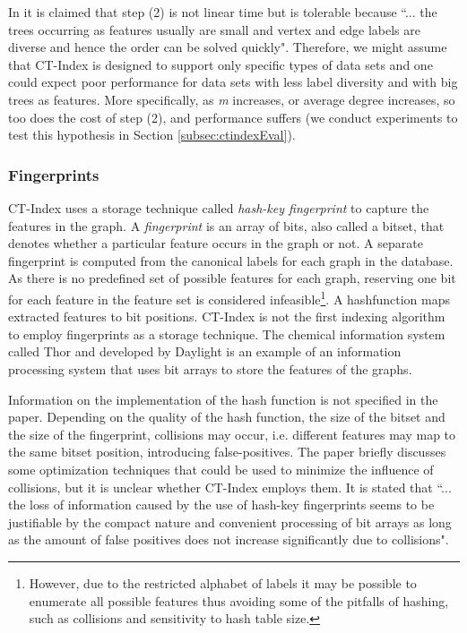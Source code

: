 \documentclass{l4proj}
\newcounter{example}[section]
\begin{document}
In \cite{ctindex} it is claimed that step (2) is not linear time but is tolerable because ``... the trees occurring as features usually are small and vertex and edge labels are diverse and hence the order can be solved quickly". Therefore, we might assume that CT-Index is designed to support only specific types of data sets and one could expect poor performance for data sets with less label diversity and with big trees as features. More specifically, as \emph{m} increases, or average degree increases, so too does the cost of step (2), and performance suffers (we conduct experiments to test this hypothesis in Section \ref{subsec:ctindexEval}).

\subsubsection{Fingerprints}

CT-Index uses a storage technique called \emph{hash-key fingerprint} to capture the features in the graph. A \emph{fingerprint} is an array of bits, also called a bitset, that denotes whether a particular feature occurs in the graph or not. A separate fingerprint is computed from the canonical labels for each graph in the database. As there is no predefined set of possible features for each graph, reserving one bit for each feature in the feature set is considered infeasible\footnote{However, due to the restricted alphabet of labels it may be possible to enumerate all possible features thus avoiding some of the pitfalls of hashing, such as collisions and sensitivity to hash table size.}. A \gls{hashfunction} maps extracted features to bit positions.
CT-Index is not the first indexing algorithm to employ fingerprints as a storage technique. The chemical information system called Thor and developed by Daylight \cite{fingerprints} is an example of an information processing system that uses bit arrays to store the features of the graphs.

Information on the implementation of the hash function is not specified in the paper. Depending on the quality of the hash function, the size of the bitset and the size of the fingerprint, collisions may occur, i.e. different features may map to the same bitset position, introducing false-positives. The \cite{ctindex} paper briefly discusses some optimization techniques that could be used to minimize the influence of collisions, but it is unclear whether CT-Index employs them. 
It is stated that ``... the loss of information caused by the use of hash-key fingerprints seems to be justifiable by the compact nature and convenient processing of bit arrays as long as the amount of false positives does not increase significantly due to collisions".
\end{document}
